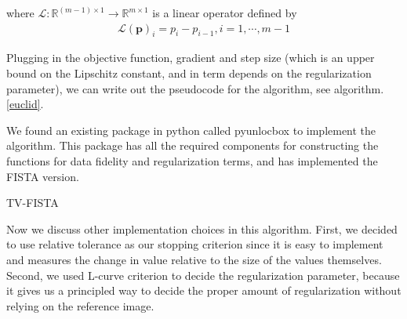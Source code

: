 \documentclass[12pt]{article}
\makeatletter
\newcommand{\noin}{\noindent}
\def\BState{\State\hskip-\ALG@thistlm}
\makeatother
\begin{document}
\noin where $\mathcal{L}: \mathbb{R}^{(m-1)\times 1} \rightarrow \mathbb{R}^{m\times 1}$ is a linear operator defined by
\begin{align}
    \mathcal{L}(\mathbf{p})_{i} = p_i - p_{i-1}, i= 1,\cdots,m-1
\end{align}

\noin Plugging in the objective function, gradient and step size (which is an upper bound on the Lipschitz constant, and in term depends on the regularization parameter), we can write out the pseudocode for the algorithm, see algorithm.\ref{euclid}. 

\vspace{0.1in}

\noin We found an existing package in python called pyunlocbox \cite{pyunlocbox} to implement the algorithm. This package has all the required components for constructing the functions for data fidelity and regularization terms, and has implemented the FISTA version. 

\begin{algorithm}
\caption{TV-FISTA}\label{euclid}
\end{algorithm}

\noin Now we discuss other implementation choices in this algorithm. First, we decided to use relative tolerance as our stopping criterion since it is easy to implement and measures the change in value relative to the size of the values themselves. Second, we used L-curve criterion to decide the regularization parameter, because it gives us a principled way to decide the proper amount of regularization without relying on the reference image. 
\end{document}
